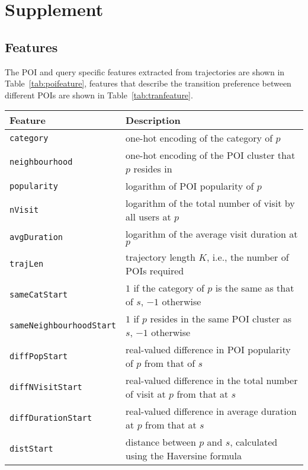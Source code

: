 \section{Supplement}
\label{sec:supplement}

\subsection{Features}
\label{sec:feature}

The POI and query specific features extracted from trajectories are shown in Table~\ref{tab:poifeature},
features that describe the transition preference between different POIs are shown in Table~\ref{tab:tranfeature}.

\begin{table*}[ht]
\caption{Features of POI $p$ with respect to query $(s,K)$}
\label{tab:poifeature}
\centering


\setlength{\tabcolsep}{10pt} %
\begin{tabular}{l|l} \hline
\textbf{Feature}       & \textbf{Description} \\ \hline
\texttt{category}      & one-hot encoding of the category of $p$ \\
\texttt{neighbourhood} & one-hot encoding of the POI cluster that $p$ resides in \\
\texttt{popularity}    & logarithm of POI popularity of $p$ \\
\texttt{nVisit}        & logarithm of the total number of visit by all users at $p$ \\
\texttt{avgDuration}  & logarithm of the average visit duration at $p$ \\
\hline

\texttt{trajLen}           & trajectory length $K$, i.e., the number of POIs required \\
\texttt{sameCatStart}      & $1$ if the category of $p$ is the same as that of $s$, $-1$ otherwise \\
\texttt{sameNeighbourhoodStart} & $1$ if $p$ resides in the same POI cluster as $s$, $-1$ otherwise \\
\texttt{diffPopStart}    & real-valued difference in POI popularity of $p$ from that of $s$ \\
\texttt{diffNVisitStart}        & real-valued difference in the total number of visit at $p$ from that at $s$ \\
\texttt{diffDurationStart}  & real-valued difference in average duration at $p$ from that at $s$ \\
\texttt{distStart}          & distance between $p$ and $s$, calculated using the Haversine formula \\
\hline
\end{tabular}
\end{table*}



